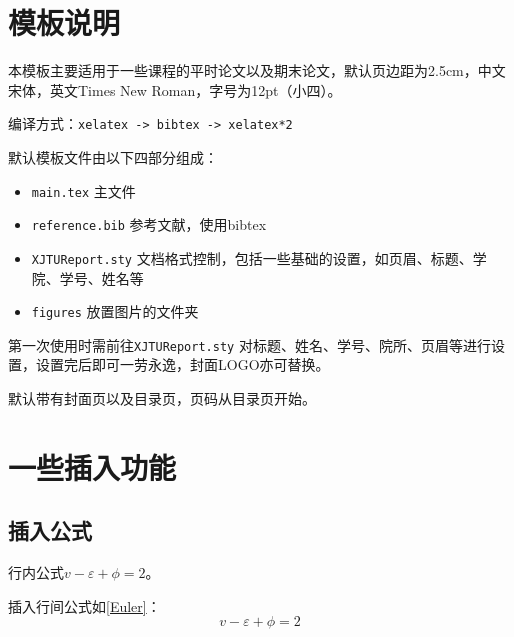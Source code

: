 \documentclass[12pt,hyperref,a4paper,UTF8]{ctexart}
\begin{document}
\cover

%
%

\thispagestyle{empty} %

\newpage
\tableofcontents

\newpage


\section{模板说明}
本模板主要适用于一些课程的平时论文以及期末论文，默认页边距为2.5cm，中文宋体，英文Times New Roman，字号为12pt（小四）。

编译方式：\verb|xelatex -> bibtex -> xelatex*2|


默认模板文件由以下四部分组成：
\begin{itemize}
    \item \texttt{main.tex} 主文件
    \item \texttt{reference.bib} 参考文献，使用bibtex
    \item \texttt{XJTUReport.sty} 文档格式控制，包括一些基础的设置，如页眉、标题、学院、学号、姓名等
    \item \texttt{figures} 放置图片的文件夹
\end{itemize}

第一次使用时需前往\texttt{XJTUReport.sty} 对标题、姓名、学号、院所、页眉等进行设置，设置完后即可一劳永逸，封面LOGO亦可替换。

默认带有封面页以及目录页，页码从目录页开始。

\section{一些插入功能}
\subsection{插入公式}
行内公式$v-\varepsilon+\phi=2$。

插入行间公式如\autoref{Euler}：
\begin{equation}
    v-\varepsilon+\phi=2
    \label{Euler}
\end{equation}
\end{document}
